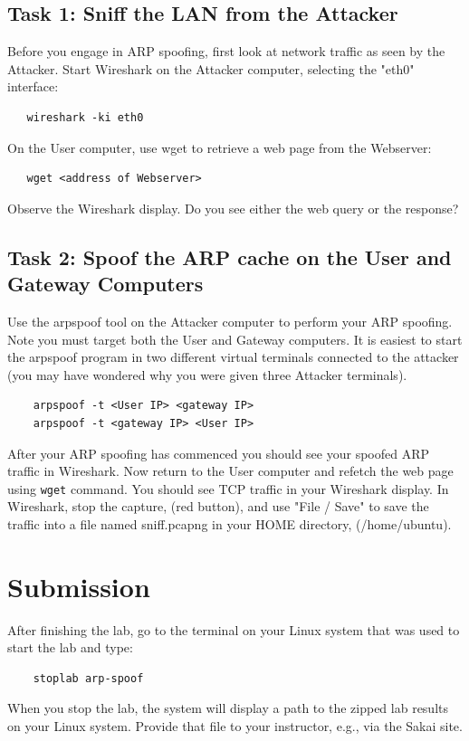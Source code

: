 \subsection{Task 1: Sniff the LAN from the Attacker}
Before you engage in ARP spoofing, first look at network traffic as seen by
the Attacker.
Start Wireshark on the Attacker computer, selecting the "eth0" interface:
\begin{verbatim}
   wireshark -ki eth0
\end{verbatim}

On the User computer, use wget to retrieve a web page from the Webserver:
\begin{verbatim}
   wget <address of Webserver>
\end{verbatim}

\noindent Observe the Wireshark display.  Do you see either the web query or the response?

\subsection{Task 2: Spoof the ARP cache on the User and Gateway Computers}
Use the arpspoof tool on the Attacker computer to perform your ARP spoofing.
Note you must target both the User and Gateway computers.  It is easiest to
start the arpspoof program in two different virtual terminals connected to the 
attacker (you may have wondered why you were given three Attacker terminals).

\begin{verbatim}
    arpspoof -t <User IP> <gateway IP>
    arpspoof -t <gateway IP> <User IP>
\end{verbatim}


After your ARP spoofing has commenced you should see your spoofed ARP traffic in Wireshark.
Now return to the User computer and refetch
the web page using {\tt wget} command.  You should see TCP traffic in your Wireshark
display.  In Wireshark, stop the capture, (red button), and use 
"File / Save" to save the traffic into a file named sniff.pcapng in your HOME directory,
(/home/ubuntu).

\section{Submission}
After finishing the lab, go to the terminal on your Linux system that was used to start the lab and type:
\begin{verbatim}
    stoplab arp-spoof
\end{verbatim}
When you stop the lab, the system will display a path to the zipped lab results on your Linux system.  Provide that file to 
your instructor, e.g., via the Sakai site.


